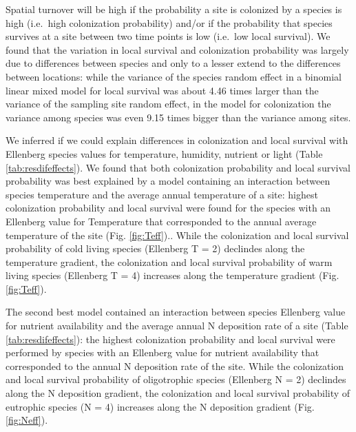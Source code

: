 \documentclass[fleqn,10pt,lineno]{wlpeerj} %
\theoremstyle{definition}
\theoremstyle{definition}
\theoremstyle{definition}
\theoremstyle{remark}
\begin{document}
Spatial turnover will be high if the probability a site is colonized by
a species is high (i.e.~high colonization probability) and/or if the
probability that species survives at a site between two time points is
low (i.e.~low local survival). We found that the variation in local
survival and colonization probability was largely due to differences
between species and only to a lesser extend to the differences between
locations: while the variance of the species random effect in a binomial
linear mixed model for local survival was about 4.46 times larger than
the variance of the sampling site random effect, in the model for
colonization the variance among species was even 9.15 times bigger than
the variance among sites.

We inferred if we could explain differences in colonization and local
survival with Ellenberg species values for temperature, humidity,
nutrient or light (Table \ref{tab:resdifeffects}). We found that both
colonization probability and local survival probability was best
explained by a model containing an interaction between species
temperature and the average annual temperature of a site: highest
colonization probability and local survival were found for the species
with an Ellenberg value for Temperature that corresponded to the annual
average temperature of the site (Fig. \ref{fig:Teff}).. While the
colonization and local survival probability of cold living species
(Ellenberg T = 2) declindes along the temperature gradient, the
colonization and local survival probability of warm living species
(Ellenberg T = 4) increases along the temperature gradient (Fig.
\ref{fig:Teff}).

The second best model contained an interaction between species Ellenberg
value for nutrient availability and the average annual N deposition rate
of a site (Table \ref{tab:resdifeffects}): the highest colonization
probability and local survival were performed by species with an
Ellenberg value for nutrient availability that corresponded to the
annual N deposition rate of the site. While the colonization and local
survival probability of oligotrophic species (Ellenberg N = 2) declindes
along the N deposition gradient, the colonization and local survival
probability of eutrophic species (N = 4) increases along the N
deposition gradient (Fig. \ref{fig:Neff}).
\end{document}
